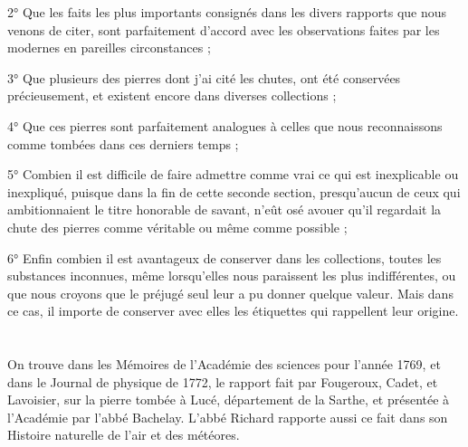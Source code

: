 \documentclass[a4paper, 12pt, oneside, french]{article}
\begin{document}
2° Que les faits les plus importants consignés dans les divers rapports que nous venons de citer, sont parfaitement d'accord avec les observations faites par les modernes en pareilles circonstances ;

3° Que plusieurs des pierres dont j'ai cité les chutes, ont été conservées précieusement, et existent encore dans diverses collections ;

4° Que ces pierres sont parfaitement analogues à celles que nous reconnaissons comme tombées dans ces derniers temps ;

5° Combien il est difficile de faire admettre comme vrai ce qui est inexplicable ou inexpliqué, puisque dans la fin de cette seconde section, presqu'aucun de ceux qui ambitionnaient le titre honorable de savant, n'eût osé avouer qu'il regardait la chute des pierres comme véritable ou même comme possible ;

6° Enfin combien il est avantageux de conserver dans les collections, toutes les substances inconnues, même lorsqu'elles nous paraissent les plus indifférentes, ou que nous croyons que le préjugé seul leur a pu donner quelque valeur. Mais dans ce cas, il importe de conserver avec elles les étiquettes qui rappellent leur origine.
\clearpage
\section{}
\paragraph{}
On trouve dans les Mémoires de l'Académie des sciences pour l'année 1769, et dans le Journal de physique de 1772, le rapport fait par Fougeroux, Cadet, et Lavoisier, sur la pierre tombée à Lucé, département de la Sarthe, et présentée à l'Académie par l'abbé Bachelay. L'abbé Richard rapporte aussi ce fait dans son Histoire naturelle de l'air et des météores.
\end{document}
